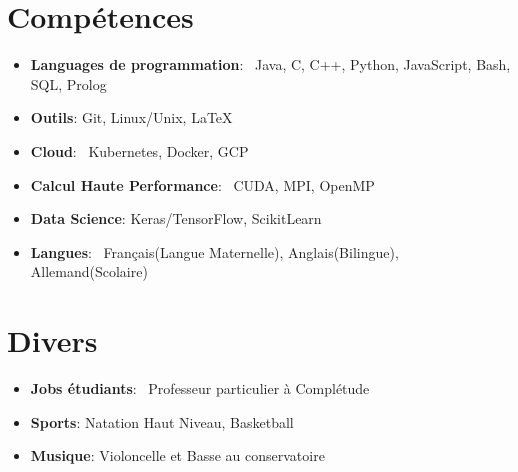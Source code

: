 \documentclass[a4paper,20pt]{article}
\newcommand{\resumeItem}[2]{
  \item\small{
    \textbf{#1}{: #2 \vspace{-2pt}}
  }
}
\newcommand{\resumeSubItem}[2]{\resumeItem{#1}{#2}\vspace{-3pt}}
\newcommand{\resumeSubHeadingListStart}{\begin{itemize}[leftmargin=*]}
\newcommand{\resumeSubHeadingListEnd}{\end{itemize}}
\begin{document}
\vspace{5pt}

\section{Compétences}
 \resumeSubHeadingListStart
  \resumeSubItem{Languages de programmation}{~Java, C, C++, Python, JavaScript, Bash, SQL, Prolog}
  \resumeSubItem{Outils}{Git, Linux/Unix, \LaTeX}
  \resumeSubItem{Cloud}{~Kubernetes, Docker, GCP}
  \resumeSubItem{Calcul Haute Performance}{~CUDA, MPI, OpenMP}
  \resumeSubItem{Data Science}{Keras/TensorFlow, ScikitLearn}
  \resumeSubItem{Langues}{~Français(Langue Maternelle), Anglais(Bilingue), Allemand(Scolaire)}
 \resumeSubHeadingListEnd

\vspace{5pt}

\section{Divers}
 \resumeSubHeadingListStart
  \resumeSubItem{Jobs étudiants}{~Professeur particulier à Complétude}
  \resumeSubItem{Sports}{Natation Haut Niveau, Basketball}
  \resumeSubItem{Musique}{Violoncelle et Basse au conservatoire}
\resumeSubHeadingListEnd
\end{document}
